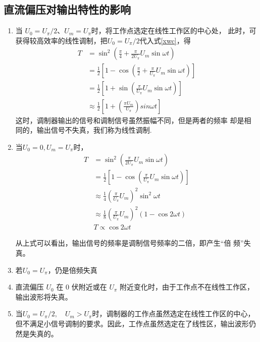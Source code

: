 \documentclass[UTF8]{ctexart}
\begin{document}
\subsection{直流偏压对输出特性的影响}
\begin{enumerate}
	\item 当 $U_{0}=U_{\pi} / 2 、 U_{m}=U_{\pi}$时，将工作点选定在线性工作区的中心处，
此时，可获得较高效率的线性调制，把$U_{0}=U_{\pi}/2$代入式\ref{xwc}，得
\begin{equation}
	\begin{aligned}
	T &=\sin ^{2}\left(\frac{\pi}{4}+\frac{\pi}{2 U_{\pi}} U_{m} \sin \omega t\right) \\
	&=\frac{1}{2}\left[1-\cos \left(\frac{\pi}{2}+\frac{\pi}{U_{\pi}} U_{m} \sin \omega t\right)\right] \\
	&=\frac{1}{2}\left[1+\sin \left(\frac{\pi}{U_{\pi}} U_{m} \sin \omega t\right)\right]\\
	&\approx \frac{1}{2}\left[1+\left(\frac{\pi U_{m}}{U_{\pi}}\right)sin\omega t \right]
	\end{aligned}
	\end{equation}
	这时，调制器输出的信号和调制信号虽然振幅不同，但是两者的频率
	却是相同的，输出信号不失真，我们称为线性调制.
	\item 当$U_{0}=0,U_{m}=U_{\pi}$时，
	\begin{equation}
			\begin{aligned}
		T &=\sin ^{2}\left(\frac{\pi}{2 U_{\pi}} U_{m} \sin \omega t\right) \\
		&=\frac{1}{2}\left[1-\cos \left(\frac{\pi}{U_{\pi}} U_{m} \sin \omega t\right)\right] \\
		& \approx \frac{1}{4}\left(\frac{\pi}{U_{\pi}} U_{m}\right)^{2} \sin ^{2} \omega t \\
		& \approx \frac{1}{8}\left(\frac{\pi}{U_{\pi}} U_{m}\right)^{2}(1-\cos 2 \omega t) \\
		& T \propto \cos 2 \omega t
		\end{aligned}
	\end{equation}

		从上式可以看出，输出信号的频率是调制信号频率的二倍，即产生“倍
频”失真。
	\item 若$U_{0}=U_{\pi}$，仍是倍频失真
	\item 直流偏压 $U_0$ 在 0 伏附近或在 $U_{\pi}$ 附近变化时，由于工作点不在线性工作区，输出波形将失真。
	\item 当$U_{0}=U_{\pi} / 2, \quad U_{m}>U_{\pi}$时，调制器的工作点虽然选定在线性工作区的中心，但不满足小信号调制的要求。因此，工作点虽然选定在了线性区，输出波形仍然是失真的。
\end{enumerate}
\end{document}
